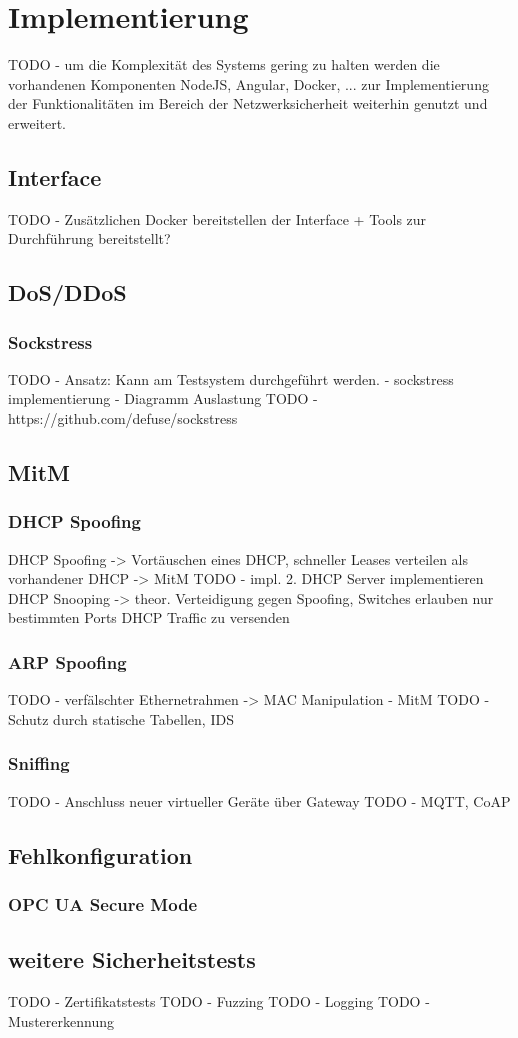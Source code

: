 \chapter{Implementierung}
TODO - um die Komplexität des Systems gering zu halten werden die vorhandenen Komponenten NodeJS, Angular, Docker, ... zur Implementierung der Funktionalitäten im Bereich der Netzwerksicherheit weiterhin genutzt und erweitert.

\section{Interface}
TODO - Zusätzlichen Docker bereitstellen der Interface + Tools zur Durchführung bereitstellt?

\section{\ac{DoS}/\ac{DDoS}}
\subsection{Sockstress}
\label{Impl:Sockstress}
TODO - Ansatz: Kann am Testsystem durchgeführt werden. - sockstress implementierung - Diagramm Auslastung
TODO - https://github.com/defuse/sockstress

\section{\ac{MitM}}
\subsection{\ac{DHCP} Spoofing}
\label{Impl:DHCP Spoofing}
DHCP Spoofing -> Vortäuschen eines DHCP, schneller Leases verteilen als vorhandener DHCP -> MitM
TODO - impl. 2. DHCP Server implementieren
DHCP Snooping -> theor. Verteidigung gegen Spoofing, Switches erlauben nur bestimmten Ports DHCP Traffic zu versenden

\subsection{\ac{ARP} Spoofing}
TODO - verfälschter Ethernetrahmen -> MAC Manipulation - MitM
TODO - Schutz durch statische Tabellen, \ac{IDS}

\subsection{Sniffing}
TODO - Anschluss neuer virtueller Geräte über Gateway
TODO - MQTT, CoAP

\section{Fehlkonfiguration}
\subsection{OPC UA Secure Mode}

\section{weitere Sicherheitstests}
TODO - Zertifikatstests
TODO - Fuzzing
TODO - Logging
TODO - Mustererkennung